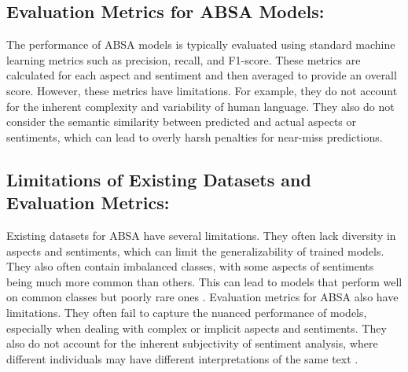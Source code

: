 \documentclass{article}
\begin{document}
\subsection{Evaluation Metrics for ABSA Models: }
The performance of ABSA models is typically evaluated using standard machine learning metrics such as precision, recall, and F1-score. These metrics are calculated for each aspect and sentiment and then averaged to provide an overall score\cite{hua2023systematic}\cite{NazirIssues&Chall2023}.
However, these metrics have limitations. For example, they do not account for the inherent complexity and variability of human language. They also do not consider the semantic similarity between predicted and actual aspects or sentiments, which can lead to overly harsh penalties for near-miss predictions\cite{NazirIssues&Chall2023}.

\subsection{Limitations of Existing Datasets and Evaluation Metrics: }
Existing datasets for ABSA have several limitations. They often lack diversity in aspects and sentiments, which can limit the generalizability of trained models. They also often contain imbalanced classes, with some aspects of sentiments being much more common than others. This can lead to models that perform well on common classes but poorly rare ones \cite{NazirIssues&Chall2023}.
Evaluation metrics for ABSA also have limitations. They often fail to capture the nuanced performance of models, especially when dealing with complex or implicit aspects and sentiments. They also do not account for the inherent subjectivity of sentiment analysis, where different individuals may have different interpretations of the same text \cite{NazirIssues&Chall2023}\cite{Dhanith2023ACE}.
\end{document}

